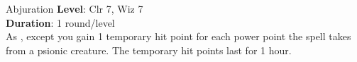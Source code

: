 {Abjuration}
{
	\textbf{Level}: Clr 7, Wiz 7\\
	\textbf{Duration}: 1 round/level\\
}
{
	As , except you gain 1 temporary hit point for each power point the spell takes from a psionic creature. The temporary hit points last for 1 hour.
}